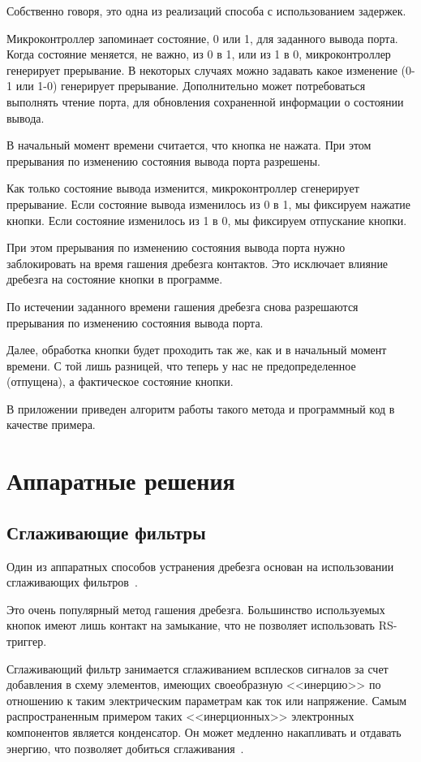 \documentclass{altsu-report}
\begin{document}
Собственно говоря, это одна из реализаций способа с использованием задержек.

Микроконтроллер запоминает состояние, 0 или 1, для заданного вывода порта. Когда состояние меняется, не важно, из 0 в 1, или из 1 в 0, микроконтроллер генерирует прерывание. В некоторых случаях можно задавать какое изменение (0-1 или 1-0) генерирует прерывание. Дополнительно может потребоваться выполнять чтение порта, для обновления сохраненной информации о состоянии вывода.

В начальный момент времени считается, что кнопка не нажата. При этом прерывания по изменению состояния вывода порта разрешены.

Как только состояние вывода изменится, микроконтроллер сгенерирует прерывание. Если состояние вывода изменилось из 0 в 1, мы фиксируем нажатие кнопки. Если состояние изменилось из 1 в 0, мы фиксируем отпускание кнопки.

При этом прерывания по изменению состояния вывода порта нужно заблокировать на время гашения дребезга контактов. Это исключает влияние дребезга на состояние кнопки в программе.

По истечении заданного времени гашения дребезга снова разрешаются прерывания по изменению состояния вывода порта.

Далее, обработка кнопки будет проходить так же, как и в начальный момент времени. С той лишь разницей, что теперь у нас не предопределенное (отпущена), а фактическое состояние кнопки.

В приложении приведен алгоритм работы такого метода и программный код в качестве примера.

\section{Аппаратные решения}

\subsection{Сглаживающие фильтры}

Один из аппаратных способов устранения дребезга основан на использовании сглаживающих фильтров~\cite{prog}.

Это очень популярный метод гашения дребезга. Большинство используемых кнопок имеют лишь контакт на замыкание, что не позволяет использовать RS-триггер.

Сглаживающий фильтр занимается сглаживанием всплесков сигналов за счет добавления в схему элементов, имеющих своеобразную <<инерцию>> по отношению к таким электрическим параметрам как ток или напряжение. Самым распространенным примером таких <<инерционных>> электронных компонентов является конденсатор. Он может медленно накапливать и отдавать энергию, что позволяет добиться сглаживания~\cite{dzen}.
\end{document}
